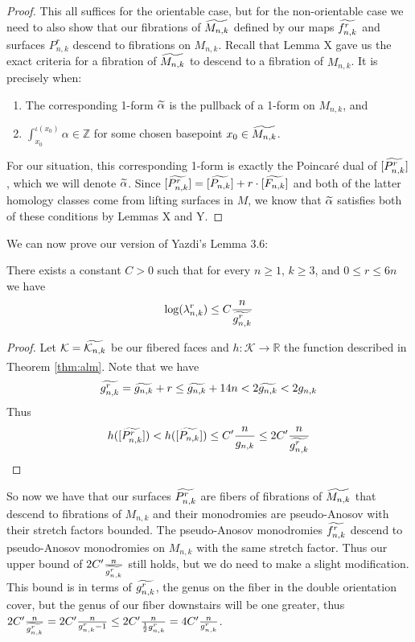 \begin{proof}
    This all suffices for the orientable case, but for the non-orientable case we need to also show that our fibrations of $\widetilde{M_{n,k}}$ defined by our maps $\widetilde{f^r_{n,k}}$ and surfaces $P^r_{n,k}$ descend to fibrations on $M_{n,k}$. Recall that Lemma X gave us the exact criteria for a fibration of $\widetilde{M_{n,k}}$ to descend to a fibration of $M_{n,k}$. It is precisely when:
    \begin{enumerate}
        \item The corresponding 1-form $\widetilde{\alpha}$ is the pullback of a 1-form on $M_{n,k}$, and
        \item $\int_{x_0}^{\iota(x_0)} \alpha \in \mathbb{Z}$ for some chosen basepoint $x_0 \in \widetilde{M_{n,k}}$.
    \end{enumerate}
    For our situation, this corresponding 1-form is exactly the Poincar\'e dual of $[\widetilde{P^r_{n,k}}]$, which we will denote $\widetilde{\alpha}$. Since $[\widetilde{P^r_{n,k}}] = [\widetilde{P_{n,k}}] + r\cdot[\widetilde{F_{n,k}}]$ and both of the latter homology classes come from lifting surfaces in $M$, we know that $\widetilde{\alpha}$ satisfies both of these conditions by Lemmas X and Y.
\end{proof}

We can now prove our version of Yazdi's Lemma 3.6:

\begin{lem}
\label{lem:bound}
There exists a constant $C > 0$ such that for every $n \geq 1$, $k \geq 3$, and $0 \leq r \leq 6n$ we have $$\log(\lambda^r_{n,k}) \leq C\frac{n}{\widetilde{g^r_{n,k}}}$$
\end{lem}
\begin{proof}
    Let $\mathcal{K} = \widetilde{\mathcal{K}_{n,k}}$ be our fibered faces and $h: \mathcal{K} \xrightarrow[]{} \mathbb{R}$ the function described in Theorem \ref{thm:alm}. Note that we have
    $$\widetilde{g^r_{n,k}} = \widetilde{g_{n,k}} + r \leq \widetilde{g_{n,k}} + 14n < 2\widetilde{g_{n,k}} < 2g_{n,k}$$
    Thus
    $$h([\widetilde{P^r_{n,k}}]) < h([\widetilde{P_{n,k}}]) \leq C'\frac{n}{g_{n,k}} \leq 2C'\frac{n}{\widetilde{g^r_{n,k}}} $$
\end{proof}

So now we have that our surfaces $\widetilde{P^r_{n,k}}$ are fibers of fibrations of $\widetilde{M_{n,k}}$ that descend to fibrations of $M_{n,k}$ and their monodromies are pseudo-Anosov with their stretch factors bounded. The pseudo-Anosov monodromies $\widetilde{f^r_{n,k}}$ descend to pseudo-Anosov monodromies on $M_{n,k}$ with the same stretch factor. Thus our upper bound of $2C'\frac{n}{\widetilde{g^{r}_{n,k}}}$ still holds, but we do need to make a slight modification. This bound is in terms of $\widetilde{g^r_{n,k}}$, the genus on the fiber in the double orientation cover, but the genus of our fiber downstairs will be one greater, thus $2C'\frac{n}{\widetilde{g^r_{n,k}}} = 2C'\frac{n}{g^r_{n,k} - 1} \leq 2C'\frac{n}{\frac{1}{2}g^r_{n,k}} = 4C'\frac{n}{g^r_{n,k}}$.

